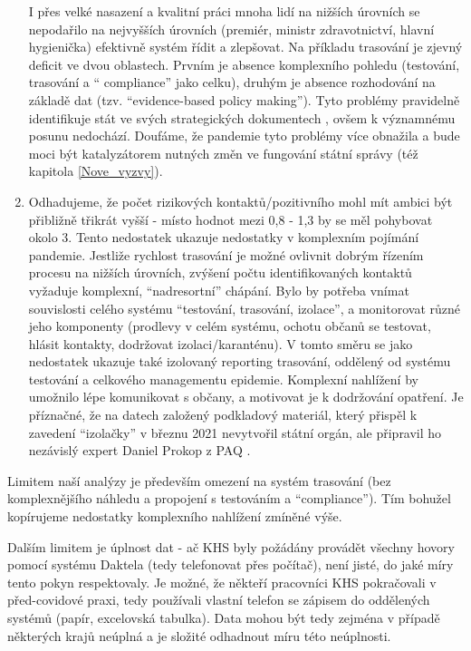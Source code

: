\begin{enumerate}
I přes velké nasazení a kvalitní práci mnoha lidí na nižších úrovních se nepodařilo na nejvyšších úrovních (premiér, ministr zdravotnictví, hlavní hygienička) efektivně systém řídit a zlepšovat. Na příkladu trasování je zjevný deficit ve dvou oblastech. Prvním je absence komplexního pohledu (testování, trasování a “ compliance” jako celku), druhým je absence rozhodování na základě dat (tzv. “evidence-based policy making”). Tyto problémy pravidelně identifikuje stát ve svých strategických dokumentech \cite{tr_MVCR, tr_MZP}, ovšem k významnému posunu nedochází. Doufáme, že pandemie tyto problémy více obnažila a bude moci být katalyzátorem nutných změn ve fungování státní správy (též kapitola \ref{Nove_vyzvy}).
\item Odhadujeme, že počet rizikových kontaktů/pozitivního mohl mít ambici být přibližně třikrát vyšší - místo hodnot mezi 0,8 - 1,3 by se měl pohybovat okolo 3. Tento nedostatek ukazuje nedostatky v komplexním pojímání pandemie. Jestliže rychlost trasování je možné ovlivnit dobrým řízením procesu na nižších úrovních, zvýšení počtu identifikovaných kontaktů vyžaduje komplexní, “nadresortní” chápání. Bylo by potřeba vnímat souvislosti celého systému “testování, trasování, izolace”, a monitorovat různé jeho komponenty (prodlevy v celém systému, ochotu občanů se
testovat, hlásit kontakty, dodržovat izolaci/karanténu). V tomto směru se jako nedostatek ukazuje také izolovaný reporting trasování, oddělený od systému testování a celkového managementu epidemie. Komplexní nahlížení by umožnilo
lépe komunikovat s občany, a motivovat je k dodržování opatření. Je příznačné, že na datech založený podkladový materiál, který přispěl k zavedení “izolačky” \cite{tr_MPSV} v březnu 2021 nevytvořil státní orgán, ale připravil ho nezávislý expert Daniel Prokop z PAQ \cite{tr_PAQ02}.
\end{enumerate}

Limitem naší analýzy je především omezení na systém trasování (bez komplexnějšího náhledu a propojení s testováním a “compliance”). Tím bohužel kopírujeme nedostatky komplexního nahlížení zmíněné výše.

Dalším limitem je úplnost dat - ač KHS byly požádány provádět všechny hovory pomocí systému Daktela (tedy telefonovat přes počítač), není jisté, do jaké míry tento pokyn respektovaly. Je možné, že někteří pracovníci KHS pokračovali v před-covidové praxi, tedy používali vlastní telefon se zápisem do oddělených systémů (papír, excelovská tabulka). Data mohou být tedy zejména v případě některých krajů neúplná a je složité odhadnout míru této neúplnosti.

